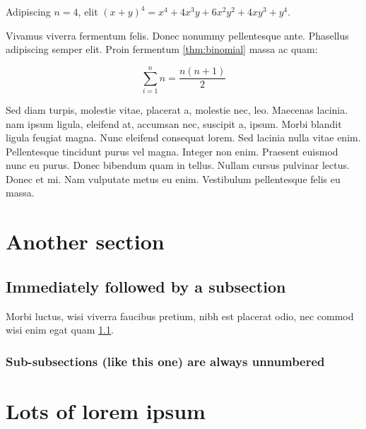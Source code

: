 \documentclass{rntz}
\begin{document}
\begin{corollary} Adipiscing $n=4$, elit
  \( (x+y)^4 = x^4 + 4x^3y + 6x^2y^2 + 4xy^3 + y^4 \).
\end{corollary}

Vivamus viverra fermentum felis. Donec nonummy pellentesque ante. Pha\-sellus
adipiscing semper elit. Proin fermentum \cref{thm:binomial} massa ac quam:

\[ \sum_{i=1}^n n = \frac{n(n+1)}{2} \]


Sed diam turpis, molestie vitae, placerat a, molestie nec, leo. Maecenas
lacinia.  nam ipsum ligula, eleifend at, accumsan nec, suscipit a,
ipsum. Morbi blandit ligula feugiat magna. Nunc eleifend consequat lorem. Sed
lacinia nulla vitae enim. Pellentesque tincidunt purus vel magna. Integer non
enim. Praesent euismod nunc eu purus. Donec bibendum quam in tellus. Nullam
cursus pulvinar lectus. Donec et mi. Nam vulputate metus eu enim. Vestibulum
pellentesque felis eu massa.

\section{Another section}\label{sec:two}
\subsection{Immediately followed by a subsection}\label{sec:two-one}

\lipsum[6]

\begin{conjecture}
  Morbi luctus, wisi viverra faucibus pretium, nibh est placerat odio, nec
  commod wisi enim egat quam \cref{sec:two-one}.
\end{conjecture}

\subsubsection{Sub-subsections (like this one) are always unnumbered}

\lipsum[7-8]


\section{Lots of lorem ipsum}
\lipsum\lipsum[1]\lipsum\lipsum[2]\lipsum\lipsum[3]\lipsum\lipsum[4]
\lipsum\lipsum[5]\lipsum\lipsum[6]\lipsum\lipsum[7]\lipsum\lipsum[8]
\lipsum\lipsum[1]\lipsum\lipsum[2]\lipsum\lipsum[3]\lipsum\lipsum[4]
\lipsum\lipsum[5]\lipsum\lipsum[6]\lipsum\lipsum[7]\lipsum\lipsum[8]
\end{document}
